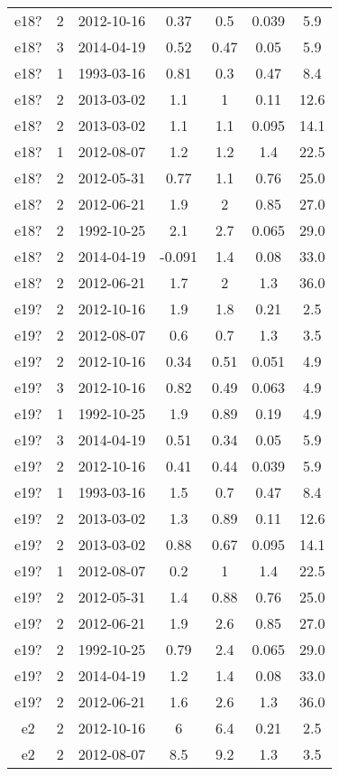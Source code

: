\begin{table*}[htp]
\begin{tabular}{ccccccc}
e18? & 2 & 2012-10-16 & 0.37 & 0.5 & 0.039 & 5.9 \\
e18? & 3 & 2014-04-19 & 0.52 & 0.47 & 0.05 & 5.9 \\
e18? & 1 & 1993-03-16 & 0.81 & 0.3 & 0.47 & 8.4 \\
e18? & 2 & 2013-03-02 & 1.1 & 1 & 0.11 & 12.6 \\
e18? & 2 & 2013-03-02 & 1.1 & 1.1 & 0.095 & 14.1 \\
e18? & 1 & 2012-08-07 & 1.2 & 1.2 & 1.4 & 22.5 \\
e18? & 2 & 2012-05-31 & 0.77 & 1.1 & 0.76 & 25.0 \\
e18? & 2 & 2012-06-21 & 1.9 & 2 & 0.85 & 27.0 \\
e18? & 2 & 1992-10-25 & 2.1 & 2.7 & 0.065 & 29.0 \\
e18? & 2 & 2014-04-19 & -0.091 & 1.4 & 0.08 & 33.0 \\
e18? & 2 & 2012-06-21 & 1.7 & 2 & 1.3 & 36.0 \\
e19? & 2 & 2012-10-16 & 1.9 & 1.8 & 0.21 & 2.5 \\
e19? & 2 & 2012-08-07 & 0.6 & 0.7 & 1.3 & 3.5 \\
e19? & 2 & 2012-10-16 & 0.34 & 0.51 & 0.051 & 4.9 \\
e19? & 3 & 2012-10-16 & 0.82 & 0.49 & 0.063 & 4.9 \\
e19? & 1 & 1992-10-25 & 1.9 & 0.89 & 0.19 & 4.9 \\
e19? & 3 & 2014-04-19 & 0.51 & 0.34 & 0.05 & 5.9 \\
e19? & 2 & 2012-10-16 & 0.41 & 0.44 & 0.039 & 5.9 \\
e19? & 1 & 1993-03-16 & 1.5 & 0.7 & 0.47 & 8.4 \\
e19? & 2 & 2013-03-02 & 1.3 & 0.89 & 0.11 & 12.6 \\
e19? & 2 & 2013-03-02 & 0.88 & 0.67 & 0.095 & 14.1 \\
e19? & 1 & 2012-08-07 & 0.2 & 1 & 1.4 & 22.5 \\
e19? & 2 & 2012-05-31 & 1.4 & 0.88 & 0.76 & 25.0 \\
e19? & 2 & 2012-06-21 & 1.9 & 2.6 & 0.85 & 27.0 \\
e19? & 2 & 1992-10-25 & 0.79 & 2.4 & 0.065 & 29.0 \\
e19? & 2 & 2014-04-19 & 1.2 & 1.4 & 0.08 & 33.0 \\
e19? & 2 & 2012-06-21 & 1.6 & 2.6 & 1.3 & 36.0 \\
e2 & 2 & 2012-10-16 & 6 & 6.4 & 0.21 & 2.5 \\
e2 & 2 & 2012-08-07 & 8.5 & 9.2 & 1.3 & 3.5 \\

\end{tabular}
\end{table*}
